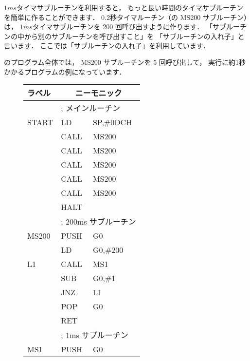 
$1ms$タイマサブルーチンを利用すると，
もっと長い時間のタイマサブルーチンを簡単に作ることができます．
0.2秒タイマルーチン（の MS200 サブルーチン）は，
$1ms$タイマサブルーチンを 200 回呼び出すように作ります．
「サブルーチンの中から別のサブルーチンを呼び出すこと」を
「サブルーチンの入れ子」と言います．
ここでは「サブルーチンの入れ子」を利用しています．

のプログラム全体では，
MS200 サブルーチンを 5 回呼び出して，
実行に約1秒かかるプログラムの例になっています．

\begin{figure}[btp]
{\small\tt\begin{center}
\begin{tabular}{|l|l l|} \hline
ラベル & \multicolumn{2}{|c|}{ニーモニック}        \\
\hline
      & \multicolumn{2}{|l|}{; メインルーチン}     \\
START & LD   & SP,\#0DCH                           \\
      & CALL & MS200                               \\
      & CALL & MS200                               \\
      & CALL & MS200                               \\
      & CALL & MS200                               \\
      & CALL & MS200                               \\
      & HALT &                                     \\
      & \multicolumn{2}{|l|}{; 200ms サブルーチン} \\
MS200 & PUSH & G0                                  \\
      & LD   & G0,\#200                            \\
L1    & CALL & MS1                                 \\
      & SUB  & G0,\#1                              \\
      & JNZ  & L1                                  \\
      & POP  & G0                                  \\
      & RET  &                                     \\
      & \multicolumn{2}{|l|}{; 1ms サブルーチン}   \\
MS1   & PUSH & G0                                  \\

\end{tabular}
\end{center}}
\end{figure}
